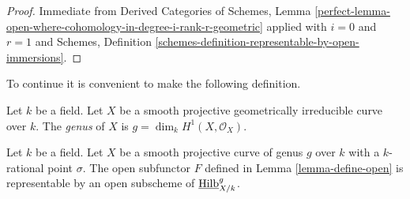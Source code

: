\begin{proof}
Immediate from Derived Categories of Schemes, Lemma
\ref{perfect-lemma-open-where-cohomology-in-degree-i-rank-r-geometric}
applied with $i = 0$ and $r = 1$ and
Schemes, Definition \ref{schemes-definition-representable-by-open-immersions}.
\end{proof}

\noindent
To continue it is convenient to make the following definition.

\begin{definition}
\label{definition-genus}
Let $k$ be a field. Let $X$ be a smooth projective geometrically irreducible
curve over $k$. The {\it genus} of $X$ is $g = \dim_k H^1(X, \mathcal{O}_X)$.
\end{definition}

\begin{lemma}
\label{lemma-open-representable}
Let $k$ be a field. Let $X$ be a smooth projective curve of genus $g$
over $k$ with a $k$-rational point $\sigma$. The open subfunctor $F$ defined
in Lemma \ref{lemma-define-open} is representable by an open subscheme of
$\underline{\mathrm{Hilb}}^g_{X/k}$.
\end{lemma}

